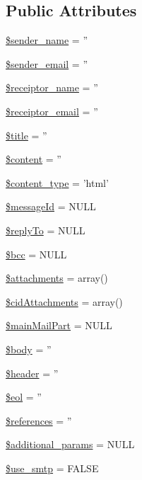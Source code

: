 \subsection*{Public Attributes}
\begin{DoxyCompactItemize}
\item 
\hyperlink{classMail_a0ad6aa18dc8ea8c632bb7a82175e8d68}{\$sender\-\_\-name} = ''
\item 
\hyperlink{classMail_a94dccbbdc161e818d90e41ad197ebe85}{\$sender\-\_\-email} = ''
\item 
\hyperlink{classMail_a44df4937f3c8b2691e9bbb1220c667f3}{\$receiptor\-\_\-name} = ''
\item 
\hyperlink{classMail_aa034785886f8bdcf3a5ed9c86ce8ed14}{\$receiptor\-\_\-email} = ''
\item 
\hyperlink{classMail_aea1a8697c961d49a688564c5ca16cbcb}{\$title} = ''
\item 
\hyperlink{classMail_a5a3320973718a2ca8a3fe798bf79c624}{\$content} = ''
\item 
\hyperlink{classMail_ac933733b17efbb4978a46e557d32c440}{\$content\-\_\-type} = 'html'
\item 
\hyperlink{classMail_a48caf58883e736f50ab87a03147c584a}{\$message\-Id} = N\-U\-L\-L
\item 
\hyperlink{classMail_a55788852017ccc1716af69cdde26df99}{\$reply\-To} = N\-U\-L\-L
\item 
\hyperlink{classMail_a2e25b3c43459422d40765d581b165692}{\$bcc} = N\-U\-L\-L
\item 
\hyperlink{classMail_a93b05b1003cc8ea16b59c00d77f47466}{\$attachments} = array()
\item 
\hyperlink{classMail_a66c6752b550e4e8fd79a63b62815f48f}{\$cid\-Attachments} = array()
\item 
\hyperlink{classMail_ad58544ae1c34119ec852e3c22b855624}{\$main\-Mail\-Part} = N\-U\-L\-L
\item 
\hyperlink{classMail_acbd542849121b33a76ed63e1c4670e02}{\$body} = ''
\item 
\hyperlink{classMail_ace98431d0944d23544743094b443d506}{\$header} = ''
\item 
\hyperlink{classMail_acaebf19cba0b8be83989e241c96f9eb7}{\$eol} = ''
\item 
\hyperlink{classMail_abcd438320caac44b166df90ba9092fe9}{\$references} = ''
\item 
\hyperlink{classMail_a38466de017089677f088c9a4025f724f}{\$additional\-\_\-params} = N\-U\-L\-L
\item 
\hyperlink{classMail_a8fe39b2063dc112d7db67be074142628}{\$use\-\_\-smtp} = F\-A\-L\-S\-E
\end{DoxyCompactItemize}


